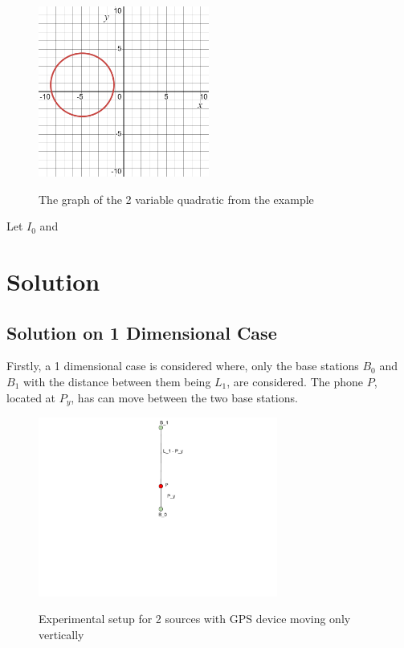 \documentclass[a4paper,12pt]{article}
\begin{document}
\begin{figure}[H]
    \caption{The graph of the 2 variable quadratic from the example}
    \centering 
    \includegraphics[width=0.5\textwidth]{abc.png}
~\label{fig:abc}
\end{figure}






Let $I_0$ and 




\section{Solution}
\subsection{Solution on 1 Dimensional Case}

Firstly, a 1 dimensional case is considered where, only the base stations $B_0$ and $B_1$ with the distance between them being $L_1$,  are considered. The phone $P$, located at $P_y$, has can move between the two base stations. 
\begin{figure}[H]
    \caption{Experimental setup for 2 sources with GPS device moving only vertically}
    \centering 
    \includegraphics[width=0.7\textwidth]{draw1.pdf}
~\label{fig:draw1}
\end{figure}
\end{document}
